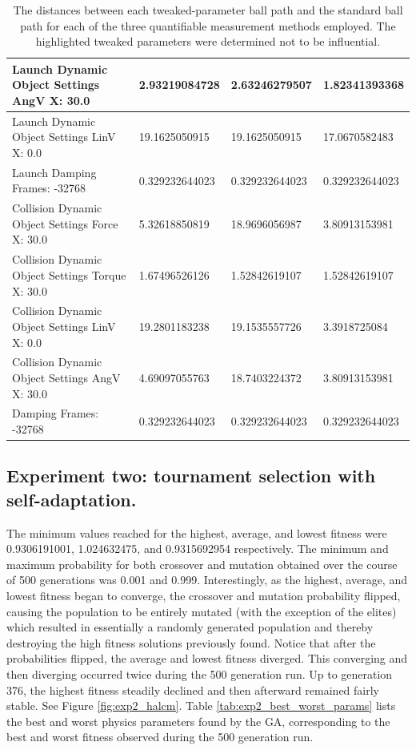 \begin{table}[htbp]
\begin{tabular}{ | l || l | l | l | }
Launch Dynamic Object Settings AngV X: 30.0 & 2.93219084728  & 2.63246279507  & 1.82341393368 \\ \hline
Launch Dynamic Object Settings LinV X: 0.0 & 19.1625050915  & 19.1625050915  & 17.0670582483 \\ \hline
\rowcolor{lightblue}
Launch Damping Frames: -32768 & 0.329232644023 & 0.329232644023  & 0.329232644023 \\ \hline
Collision Dynamic Object Settings Force X: 30.0 & 5.32618850819  & 18.9696056987  & 3.80913153981 \\ \hline
Collision Dynamic Object Settings Torque X: 30.0 & 1.67496526126  & 1.52842619107  & 1.52842619107 \\ \hline
Collision Dynamic Object Settings LinV X: 0.0 & 19.2801183238  & 19.1535557726  & 3.3918725084 \\ \hline
Collision Dynamic Object Settings AngV X: 30.0 & 4.69097055763 & 18.7403224372 & 3.80913153981 \\ \hline
\rowcolor{lightblue}
Damping Frames: -32768 & 0.329232644023 & 0.329232644023 & 0.329232644023 \\ \hline
\end{tabular}
\caption[Physics Engine Parameter Influences]{The distances between each tweaked-parameter ball path and the standard ball path for each of the three quantifiable measurement methods employed. The highlighted tweaked parameters were determined not to be influential.}
\label{tab:distances}
\end{table}

\newpage

\subsection[Experiment Two]{Experiment two: tournament selection with self-adaptation.}
\label{subsec:bbautotune_exp_two}

The minimum values reached for the highest, average, and lowest fitness were 0.9306191001, 1.024632475, and 0.9315692954 respectively. The minimum and maximum probability for both crossover and mutation obtained over the course of 500 generations was 0.001 and 0.999. Interestingly, as the highest, average, and lowest fitness began to converge, the crossover and mutation probability flipped, causing the population to be entirely mutated (with the exception of the elites) which resulted in essentially a randomly generated population and thereby destroying the high fitness solutions previously found. Notice that after the probabilities flipped, the average and lowest fitness diverged. This converging and then diverging occurred twice during the 500 generation run. Up to generation 376, the highest fitness steadily declined and then afterward remained fairly stable. See Figure \ref{fig:exp2_halcm}. Table \ref{tab:exp2_best_worst_params} lists the best and worst physics parameters found by the GA, corresponding to the best and worst fitness observed during the 500 generation run.


